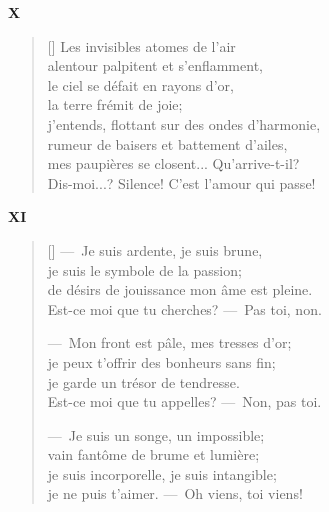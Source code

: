 \documentclass[a4paper,12pt]{book}
\begin{document}
\bigskip

\begin{center}
  \textbf{X}
\end{center}

\settowidth{\versewidth}{Dis-moi...? Silence! C'est l'amour qui passe!}

\begin{verse}[\versewidth]
  Les invisibles atomes de l'air \\
  alentour palpitent et s'enflamment, \\
  le ciel se défait en rayons d'or, \\
  la terre frémit de joie; \\
  j'entends, flottant sur des ondes d'harmonie, \\
  rumeur de baisers et battement d'ailes, \\
  mes paupières se closent... Qu'arrive-t-il? \\
  Dis-moi...? Silence! C'est l'amour qui passe! %
\end{verse}

\bigskip

\begin{center}
  \textbf{XI}
\end{center}

\settowidth{\versewidth}{de désirs de jouissance mon âme est pleine.}

\begin{verse}[\versewidth]
  ---~Je suis ardente, je suis brune, \\
  je suis le symbole de la passion; \\
  de désirs de jouissance mon âme est pleine. \\
  Est-ce moi que tu cherches? ---~Pas toi, non.

  ---~Mon front est pâle, mes tresses d'or; \\
  je peux t'offrir des bonheurs sans fin; \\
  je garde un trésor de tendresse. \\
  Est-ce moi que tu appelles? ---~Non, pas toi.

  ---~Je suis un songe, un impossible; \\
  vain fantôme de brume et lumière; \\
  je suis incorporelle, je suis intangible; \\
  je ne puis t'aimer. ---~Oh viens, toi viens!
\end{verse}
\end{document}
